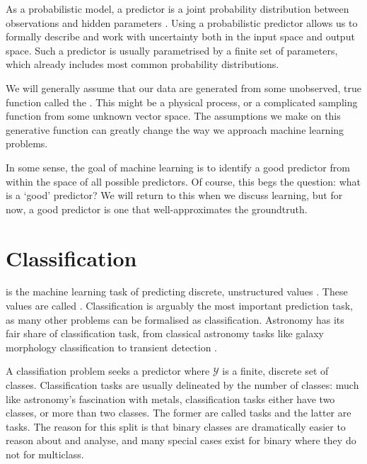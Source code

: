     As a probabilistic model, a predictor is a joint probability distribution between observations and hidden parameters \citep{deisenroth_mathematics_2020}. Using a probabilistic predictor allows us to formally describe and work with uncertainty both in the input space and output space. Such a predictor is usually parametrised by a finite set of parameters, which already includes most common probability distributions.

    We will generally assume that our data are generated from some unobserved, true function called the . This might be a physical process, or a complicated sampling function from some unknown vector space. The assumptions we make on this generative function can greatly change the way we approach machine learning problems.

    In some sense, the goal of machine learning is to identify a good predictor from within the space of all possible predictors. Of course, this begs the question: what is a `good' predictor? We will return to this when we discuss learning, but for now, a good predictor is one that well-approximates the groundtruth.

\section{Classification}
\label{sec:classification}
     is the machine learning task of predicting discrete, unstructured values \citep{deisenroth_mathematics_2020}. These values are called . Classification is arguably the most important prediction task, as many other problems can be formalised as classification. Astronomy has its fair share of classification task, from classical astronomy tasks like galaxy morphology classification \citep[appearing in machine learning literature as e.g.][]{dieleman15cnn} to transient detection \citeneeded.

    A classifiation problem seeks a predictor where $\mathcal Y$ is a finite, discrete set of classes. Classification tasks are usually delineated by the number of classes: much like astronomy's fascination with metals, classification tasks either have two classes, or more than two classes. The former are called  tasks and the latter are  tasks. The reason for this split is that binary classes are dramatically easier to reason about and analyse, and many special cases exist for binary where they do not for multiclass.

